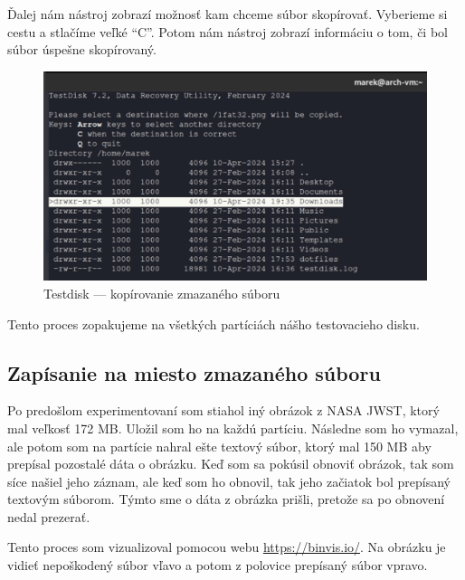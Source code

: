 \documentclass[12pt,oneside,slovak,a4paper]{article}
\begin{document}
Ďalej nám nástroj zobrazí možnosť kam chceme súbor skopírovať. Vyberieme si cestu a stlačíme veľké ``C''. Potom nám nástroj zobrazí informáciu o tom, či bol súbor úspešne skopírovaný.

\begin{figure}[H]
	\centering
	\includegraphics[scale=0.8]{./images/testdisk_testing/testdisk_deleted_file_recovery2.png}
	\centering
	\captionsetup{justification=centering,margin=2cm}
	\caption{Testdisk --- kopírovanie zmazaného súboru}
\end{figure}

Tento proces zopakujeme na všetkých partíciách nášho testovacieho disku.

\subsection{Zapísanie na miesto zmazaného súboru}
Po predošlom experimentovaní som stiahol iný obrázok z NASA JWST, ktorý mal veľkosť 172 MB. Uložil som ho na každú partíciu. Následne som ho vymazal, ale potom som na partície nahral ešte textový súbor, ktorý mal 150 MB aby prepísal pozostalé dáta o obrázku. Keď som sa pokúsil obnoviť obrázok, tak som síce našiel jeho záznam, ale keď som ho obnovil, tak jeho začiatok bol prepísaný textovým súborom. Týmto sme o dáta z obrázka prišli, pretože sa po obnovení nedal prezerať.

Tento proces som vizualizoval pomocou webu \url{https://binvis.io/}. Na obrázku je vidieť nepoškodený súbor vľavo a potom z polovice prepísaný súbor vpravo.
\end{document}
